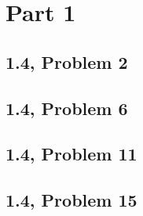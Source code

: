 \documentclass[10pt]{mypackage}
\begin{document}
\RaggedRight
\section{Part 1}%
\subsection{1.4, Problem 2}%
\subsection{1.4, Problem 6}%
\subsection{1.4, Problem 11}%
\subsection{1.4, Problem 15}%
\end{document}
